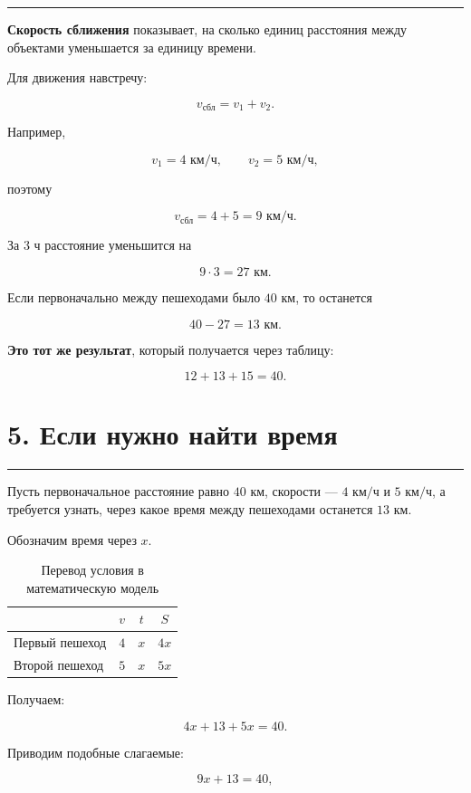 \documentclass[a4paper,12pt]{article}
\newcommand{\km}{\text{ км}}
\newcommand{\kmh}{\text{ км/ч}}
\newcommand{\hour}{\text{ ч}}
\newcommand{\sectionline}{
    \vspace{-0.2em}
    {\color{linegray}\rule{\linewidth}{0.5pt}}
    \vspace{0.5em}
}
\newcommand{\key}[1]{\textcolor{darkaccent}{\textbf{#1}}}
\begin{document}
\sectionline

\key{Скорость сближения} показывает, на сколько единиц расстояния между
объектами уменьшается за единицу времени.

Для движения навстречу:

\[
\boxed{v_{\text{сбл}}=v_1+v_2}.
\]

Например,

\[
v_1=4\kmh,\qquad v_2=5\kmh,
\]

поэтому

\[
v_{\text{сбл}}=4+5=9\kmh.
\]

За \(3\hour\) расстояние уменьшится на

\[
9\cdot3=27\km.
\]

Если первоначально между пешеходами было \(40\km\), то останется

\[
40-27=13\km.
\]

\textbf{Это тот же результат}, который получается через таблицу:

\[
12+13+15=40.
\]


\section*{\textcolor{darkaccent}{5. Если нужно найти время}}

\sectionline

Пусть первоначальное расстояние равно \(40\km\), скорости ---
\(4\kmh\) и \(5\kmh\), а требуется узнать, через какое время между
пешеходами останется \(13\km\).

Обозначим время через \(x\).

\begin{table}[h!]
\centering
\caption{Перевод условия в математическую модель}
\renewcommand{\arraystretch}{1.35}
\begin{tabularx}{0.88\linewidth}{Xccc}
\toprule
& \(v\) & \(t\) & \(S\)\\
\midrule
Первый пешеход & \(4\) & \(x\) & \(4x\)\\
Второй пешеход & \(5\) & \(x\) & \(5x\)\\
\bottomrule
\end{tabularx}
\end{table}

Получаем:

\[
4x+13+5x=40.
\]

Приводим подобные слагаемые:

\[
9x+13=40,
\]
\end{document}
